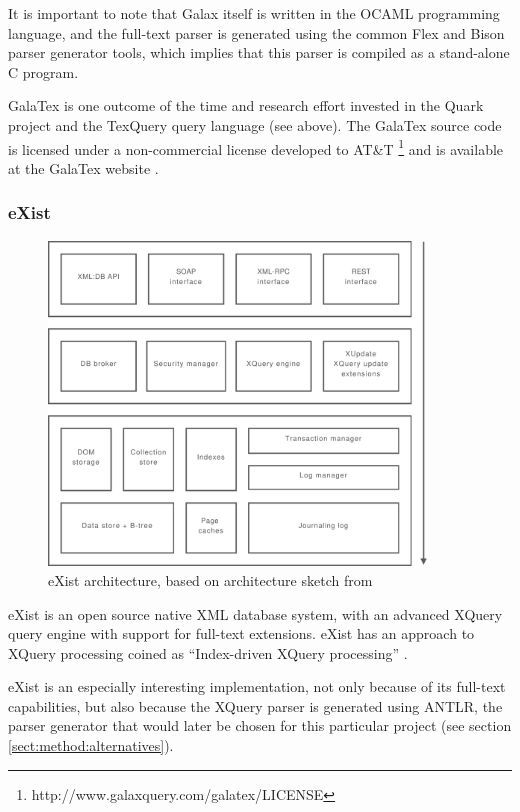 It is important to note that Galax itself is written in the OCAML programming
language, and the full-text parser is generated using the common Flex and Bison
parser generator tools, which implies that this parser is compiled as a
stand-alone C program.

GalaTex is one outcome of the time and research effort invested in the Quark
project and the TexQuery query language (see above). The GalaTex
source code is licensed under a non-commercial license developed to AT\&{}T 
\footnote{http://www.galaxquery.com/galatex/LICENSE} and is available at the
GalaTex website \cite{galatex}.

\subsubsection{eXist}
\label{sect:stateOfTheArt:eXist}

\begin{figure}[!h]
  \centering
    \includegraphics[width=0.9\textwidth]{diagrams/exist_arch}
  \caption[eXist architecture]{eXist architecture, based on architecture sketch
  from \cite{exist_indexdriven}}
\end{figure}

eXist is an open source native XML database system, with an advanced XQuery
query engine with support for full-text extensions. eXist has an approach to
XQuery processing coined as ``Index-driven XQuery processing''
\cite{exist_idx_drv_query}.

eXist is an especially interesting implementation, not only because of its
full-text capabilities, but also because the XQuery parser is generated using
ANTLR, the parser generator that would later be chosen for this particular
project (see section \ref{sect:method:alternatives}).

